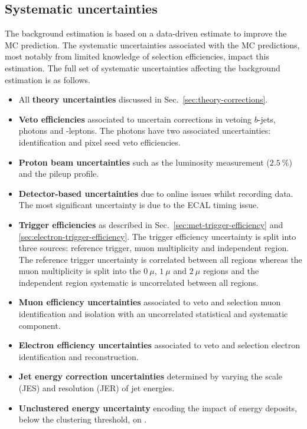 \subsection{Systematic uncertainties}

The \IWj background estimation is based on a data-driven estimate to improve the MC prediction. The systematic uncertainties associated with the MC predictions, most notably from limited knowledge of selection efficiencies, impact this estimation. The full set of systematic uncertainties affecting the background estimation is as follows.

\begin{itemize}
    \item All \textbf{theory uncertainties} discussed in Sec.~\ref{sec:theory-corrections}.
    \item \textbf{Veto efficiencies} associated to uncertain corrections in vetoing $b$-jets, photons and \Ptauh-leptons. The photons have two associated uncertainties: identification and pixel seed veto efficiencies.
    \item \textbf{Proton beam uncertainties} such as the luminosity measurement ($\SI{2.5}{\%}$) and the pileup profile.
    \item \textbf{Detector-based uncertainties} due to online issues whilst recording data. The most significant uncertainty is due to the ECAL timing issue.
    \item \textbf{Trigger efficiencies} as described in Sec.~\ref{sec:met-trigger-efficiency} and \ref{sec:electron-trigger-efficiency}. The \ptmiss trigger efficiency uncertainty is split into three sources: reference trigger, muon multiplicity and independent region. The reference trigger uncertainty is correlated between all regions whereas the muon multiplicity is split into the $0\ \mu$, $1\ \mu$ and $2\ \mu$ regions and the independent region systematic is uncorrelated between all regions.
    \item \textbf{Muon efficiency uncertainties} associated to veto and selection muon identification and isolation with an uncorrelated statistical and systematic component.
    \item \textbf{Electron efficiency uncertainties} associated to veto and selection electron identification and reconstruction.
    \item \textbf{Jet energy correction uncertainties} determined by varying the scale (JES) and resolution (JER) of jet energies.
    \item \textbf{Unclustered energy uncertainty} encoding the impact of energy deposits, below the clustering threshold, on \ptmiss.
\end{itemize}


